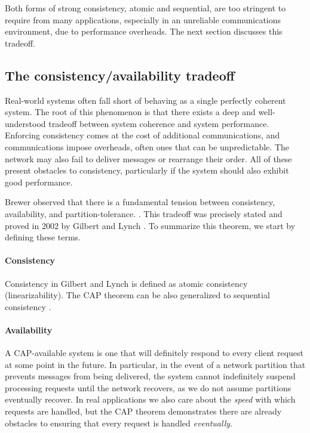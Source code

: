 Both forms of strong consistency, atomic and sequential, are too
stringent to require from many applications, especially in an
unreliable communications environment, due to performance overheads.
The next section discusses this tradeoff.

\subsection{The consistency/availability tradeoff}

Real-world systems often fall short of behaving as a single perfectly
coherent system. The root of this phenomenon is that there exists a
deep and well-understood tradeoff between system coherence and system
performance. Enforcing consistency comes at the cost of additional
communications, and communications impose overheads, often ones that
can be unpredictable. The network may also fail to deliver messages or
rearrange their order. All of these present obstacles to consistency,
particularly if the system should also exhibit good performance.

Brewer observed that there is a fundamental tension between
consistency, availability, and partition-tolerance.
\cite{2000brewerCAP}. This tradeoff was precisely stated and proved in
2002 by Gilbert and Lynch \cite{2002gilbertlynchCAP}. To summarize
this theorem, we start by defining these terms.

\paragraph{Consistency}

Consistency in Gilbert and Lynch is defined as atomic consistency
(linearizability). The CAP theorem can be also generalized to
sequential consistency \cite{}.

\paragraph{Availability}

A CAP-available system is one that will definitely respond to every
client request at some point in the future. In particular, in the
event of a network partition that prevents messages from being
delivered, the system cannot indefinitely suspend processing requests
until the network recovers, as we do not assume partitions eventually
recover. In real applications we also care about the \emph{speed} with
which requests are handled, but the CAP theorem demonstrates there are
already obstacles to ensuring that every request is handled
\emph{eventually}.

